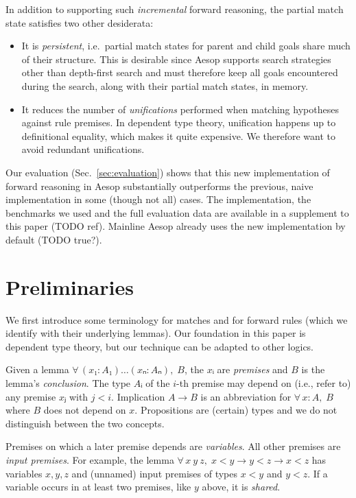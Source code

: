 \documentclass[runningheads]{llncs}
\newcommand{\All}[2]{\ensuremath{\forall\, #1,\; #2}}
\begin{document}
In addition to supporting such \emph{incremental} forward reasoning, the partial match state satisfies two other desiderata:
\begin{itemize}
  \item It is \emph{persistent}, i.e.\ partial match states for parent and child goals share much of their structure.
        This is desirable since Aesop supports search strategies other than depth-first search and must therefore keep all goals encountered during the search, along with their partial match states, in memory.
  \item It reduces the number of \emph{unifications} performed when matching hypotheses against rule premises.
        In dependent type theory, unification happens up to definitional equality, which makes it quite expensive.
        We therefore want to avoid redundant unifications.
\end{itemize}

Our evaluation (Sec.~\ref{sec:evaluation}) shows that this new implementation of forward reasoning in Aesop substantially outperforms the previous, naive implementation in some (though not all) cases.
The implementation, the benchmarks we used and the full evaluation data are available in a supplement to this paper (TODO ref).
Mainline Aesop already uses the new implementation by default (TODO true?).

\section{Preliminaries}

We first introduce some terminology for matches and for forward rules (which we identify with their underlying lemmas).
Our foundation in this paper is dependent type theory, but our technique can be adapted to other logics.

Given a lemma $\All{(x₁ : A₁) \dots (xₙ : Aₙ)}{B}$, the $xᵢ$ are \emph{premises} and $B$ is the lemma's \emph{conclusion}.
The type $Aᵢ$ of the $i$-th premise may depend on (i.e., refer to) any premise $xⱼ$ with $j < i$.
Implication $A → B$ is an abbreviation for $\All{x : A}{B}$ where $B$ does not depend on $x$.
Propositions are (certain) types and we do not distinguish between the two concepts.

Premises on which a later premise depends are \emph{variables}.
All other premises are \emph{input premises}.
For example, the lemma $\All{x~y~z}{x < y → y < z → x < z}$ has variables $x, y, z$ and (unnamed) input premises of types $x < y$ and $y < z$.
If a variable occurs in at least two premises, like $y$ above, it is \emph{shared}.
\end{document}
